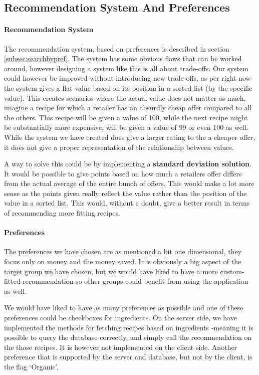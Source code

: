 \subsection{Recommendation System And Preferences}
\label{subsec:recommend}

\paragraph{Recommendation System}
The recommendation system, based on preferences is described in section \ref{subsec:searchbypref}. The system has some obvious flaws that can be worked around, however designing a system like this is all about trade-offs. Our system could however be improved without introducing new trade-offs, as per right now the system gives a flat value based on its position in a sorted list (by the specific value). This creates scenarios where the actual value does not matter as much, imagine a recipe for which a retailer has an absurdly cheap offer compared to all the others. This recipe will be given a value of 100, while the next recipe might be substantially more expensive, will be given a value of 99 or even 100 as well. While the system we have created does give a larger rating to the a cheaper offer, it does not give a proper representation of the relationship between values.

A way to solve this could be by implementing a \textbf{standard deviation solution}. It would be possible to give points based on how much a retailers offer differs from the actual average of the entire bunch of offers. This would make a lot more sense as the points given really reflect the value rather than the position of the value in a sorted list. This would, without a doubt, give a better result in terms of recommending more fitting recipes.

\paragraph{Preferences}
The preferences we have chosen are as mentioned a bit one dimensional, they focus only on money and the money saved. It is obviously a big aspect of the target group we have chosen, but we would have liked to have a more custom-fitted recommendation so other groups could benefit from using the application as well.

We would have liked to have as many preferences as possible and one of these preferences could be checkboxes for ingredients. On the server side, we have implemented the methods for fetching recipes based on ingredients -meaning it is possible to query the database correctly, and simply call the recommendation on the those recipes. It is however not implemented on the client side. Another preference that is supported by the server and database, but not by the client, is the flag `Organic'. 


